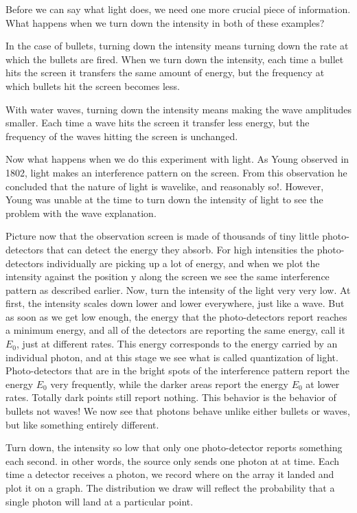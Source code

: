 \documentclass[12pt, oneside]{book}
\theoremstyle{definition}
\theoremstyle{definition}
\theoremstyle{remark}
\begin{document}
Before we can say what light does, we need one more crucial piece of information. What happens when we turn down the intensity in both of these examples?

In the case of bullets, turning down the intensity means turning down the rate at which the bullets are fired. When we turn down the intensity, each time a bullet hits the screen it transfers the same amount of energy, but the frequency at which bullets hit the screen becomes less.

With water waves, turning down the intensity means making the wave amplitudes smaller. Each time a wave hits the screen it transfer less energy, but the frequency of the waves hitting the screen is unchanged.

Now what happens when we do this experiment with light. As Young observed in 1802, light makes an interference pattern on the screen. From this observation he concluded that the nature of light is wavelike, and reasonably so!.  However, Young was unable at the time to turn down the intensity of light to see the problem with the wave explanation.

Picture now that the observation screen is made of thousands of tiny little photo-detectors that can detect the energy they absorb. For high intensities the photo-detectors individually are picking up a lot of energy, and when we plot the intensity against the position y along the screen we see the same interference pattern as described earlier. Now, turn the intensity of the light very very low. At first, the intensity scales down lower and lower everywhere, just like a wave. But as soon as we get low enough, the energy that the photo-detectors report reaches a minimum energy, and all of the detectors are reporting the same energy, call it $E_0$, just at different rates. This energy corresponds to the energy carried by an individual photon, and at this stage we see what is called quantization of light. Photo-detectors that are in the bright spots of the interference pattern report the energy $E_0$ very frequently, while the darker areas report the energy $E_0$ at lower rates. Totally dark points still report nothing. This behavior is the behavior of bullets not waves! We now see that photons behave unlike either bullets or waves, but like something entirely different.

Turn down, the intensity so low that only one photo-detector reports something each second. in other words, the source only sends one photon at at time. Each time a detector receives a photon, we record where on the array it landed and plot it on a graph. The distribution we draw will reflect the probability that a single photon will land at a particular point.
\end{document}
